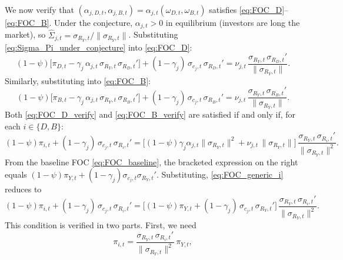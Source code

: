 \documentclass[11pt,english]{article}
\begin{document}
We now verify that $(\alpha_{j,D,t},\alpha_{j,B,t})=\alpha_{j,t}(\omega_{D,t},\omega_{B,t})$ satisfies \eqref{eq:FOC_D}--\eqref{eq:FOC_B}. Under the conjecture, $\alpha_{j,t}>0$ in equilibrium (investors are long the market), so $\widehat{\Sigma}_{j,t}=\sigma_{R_Y,t}/\|\sigma_{R_Y,t}\|$. Substituting \eqref{eq:Sigma_Pi_under_conjecture} into \eqref{eq:FOC_D}:
\begin{equation}\label{eq:FOC_D_verify}
    (1-\psi)\Big[\pi_{D,t} - \gamma_j\,\alpha_{j,t}\,\sigma_{R_Y,t}\,\sigma_{R_D,t}'\Big]
    + (1-\gamma_j)\,\sigma_{c_j,t}\,\sigma_{R_D,t}'
    = \nu_{j,t}\,\frac{\sigma_{R_Y,t}\,\sigma_{R_D,t}'}{\|\sigma_{R_Y,t}\|}.
\end{equation}
Similarly, substituting into \eqref{eq:FOC_B}:
\begin{equation}\label{eq:FOC_B_verify}
    (1-\psi)\Big[\pi_{B,t} - \gamma_j\,\alpha_{j,t}\,\sigma_{R_Y,t}\,\sigma_{R_B,t}'\Big]
    + (1-\gamma_j)\,\sigma_{c_j,t}\,\sigma_{R_B,t}'
    = \nu_{j,t}\,\frac{\sigma_{R_Y,t}\,\sigma_{R_B,t}'}{\|\sigma_{R_Y,t}\|}.
\end{equation}
Both \eqref{eq:FOC_D_verify} and \eqref{eq:FOC_B_verify} are satisfied if and only if, for each $i\in\{D,B\}$:
\begin{equation}\label{eq:FOC_generic_i}
    (1-\psi)\pi_{i,t}
    + (1-\gamma_j)\,\sigma_{c_j,t}\,\sigma_{R_i,t}'
    =\Big[(1-\psi)\gamma_j\alpha_{j,t}\|\sigma_{R_Y,t}\|^2 + \nu_{j,t}\,\|\sigma_{R_Y,t}\|\Big]\,
    \frac{\sigma_{R_Y,t}\,\sigma_{R_i,t}'}{\|\sigma_{R_Y,t}\|^2}.
\end{equation}
From the baseline FOC \eqref{eq:FOC_baseline}, the bracketed expression on the right equals $(1-\psi)\pi_{Y,t}+(1-\gamma_j)\sigma_{c_j,t}\sigma_{R_Y,t}'$. Substituting, \eqref{eq:FOC_generic_i} reduces to
\begin{equation}\label{eq:verification_reduced}
    (1-\psi)\pi_{i,t}
    + (1-\gamma_j)\,\sigma_{c_j,t}\,\sigma_{R_i,t}'
    = \Big[(1-\psi)\pi_{Y,t}
    + (1-\gamma_j)\,\sigma_{c_j,t}\,\sigma_{R_Y,t}'\Big]\,
    \frac{\sigma_{R_Y,t}\,\sigma_{R_i,t}'}{\|\sigma_{R_Y,t}\|^2}.
\end{equation}
This condition is verified in two parts. First, we need
\begin{equation}\label{eq:verify_premium}
    \pi_{i,t} = \frac{\sigma_{R_Y,t}\,\sigma_{R_i,t}'}{\|\sigma_{R_Y,t}\|^2}\,\pi_{Y,t},
\end{equation}
\end{document}

